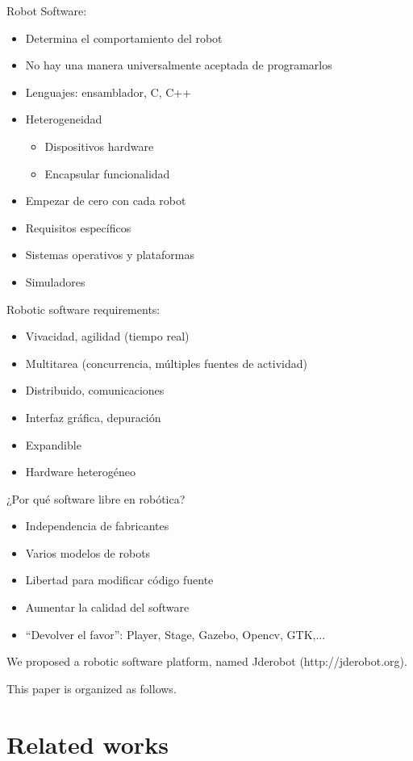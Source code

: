 \documentclass[twocolumn]{svjour3}          %
\begin{document}
Robot Software:
\begin{itemize}
\item Determina el comportamiento del robot
\item No hay una manera universalmente aceptada de programarlos
\item Lenguajes: ensamblador, C, C++
\item {Heterogeneidad}
\begin{itemize}
\item Dispositivos hardware
\item Encapsular funcionalidad
\end{itemize}
\item Empezar de cero con cada robot
\item Requisitos específicos
\item Sistemas operativos y plataformas
\item Simuladores
\end{itemize}

Robotic software requirements:
\begin{itemize}
\item Vivacidad, agilidad (tiempo real)
\item Multitarea (concurrencia, múltiples fuentes de actividad)
\item Distribuido, comunicaciones
\item Interfaz gráfica, depuración
\item Expandible
\item Hardware heterogéneo
\end{itemize}

¿Por qué software libre en robótica?
\begin{itemize}
\item Independencia de fabricantes
\item Varios modelos de robots
\item Libertad para modificar código fuente
\item Aumentar la calidad del software
\item ``Devolver el favor'': Player, Stage, Gazebo, Opencv, GTK,...
\end{itemize}

We proposed a robotic software platform, named Jderobot (http://jderobot.org).

This paper is organized as follows.

\section{Related works}
\label{sec:relatedworks}
\end{document}
